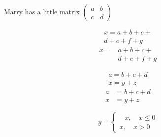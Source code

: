 \documentclass[UTF8]{ctexart}
\begin{document}
Marry has a little matrix $( \begin{smallmatrix} a&b\\c&d \end{smallmatrix})$

\begin{multline}
x=a+b+c+{}\\
d+e+f+g
\end{multline}
\[
\begin{aligned}
x={}& a+b+c+{}\\
&d+e+f+g
\end{aligned}
\]

\begin{gather}
a = b+c+d \\
x = y+z
\end{gather}
\begin{align}
a &= b+c+d \\
x &= y+z
\end{align}

\[
y=\begin{cases}
-x,\quad x\leq 0\\
x,\quad x>0
\end{cases}
\]
\end{document}
